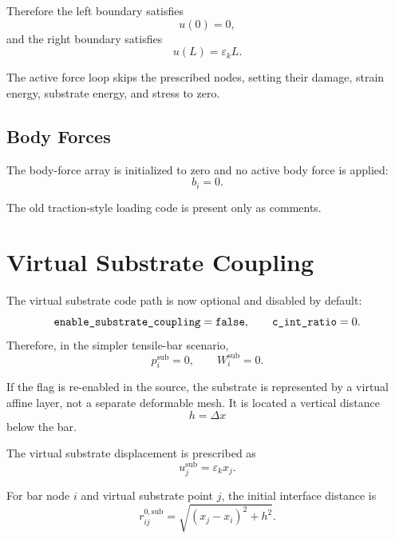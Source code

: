 \documentclass[11pt]{article}
\newcommand{\code}[1]{\texttt{\detokenize{#1}}}
\begin{document}
Therefore the left boundary satisfies
\begin{equation}
    u(0)=0,
\end{equation}
and the right boundary satisfies
\begin{equation}
    u(L)=\varepsilon_k L.
\end{equation}

The active force loop skips the prescribed nodes, setting their damage, strain
energy, substrate energy, and stress to zero.

\subsection{Body Forces}

The body-force array is initialized to zero and no active body force is applied:
\begin{equation}
    b_i=0 .
\end{equation}

The old traction-style loading code is present only as comments.

\section{Virtual Substrate Coupling}

The virtual substrate code path is now optional and disabled by default:
\begin{equation}
    \code{enable_substrate_coupling}=\code{false},
    \qquad
    \code{c_int_ratio}=0.
\end{equation}
Therefore, in the simpler tensile-bar scenario,
\begin{equation}
    p_i^{\mathrm{sub}}=0,
    \qquad
    W_i^{\mathrm{sub}}=0.
\end{equation}

If the flag is re-enabled in the source, the substrate is represented by a
virtual affine layer, not a separate deformable mesh. It is located a vertical distance
\begin{equation}
    h=\Delta x
\end{equation}
below the bar.

The virtual substrate displacement is prescribed as
\begin{equation}
    u_j^{\mathrm{sub}} =
    \varepsilon_k x_j .
\end{equation}

For bar node \(i\) and virtual substrate point \(j\), the initial interface
distance is
\begin{equation}
    r_{ij}^{0,\mathrm{sub}}
    =
    \sqrt{(x_j-x_i)^2+h^2}.
\end{equation}
\end{document}
